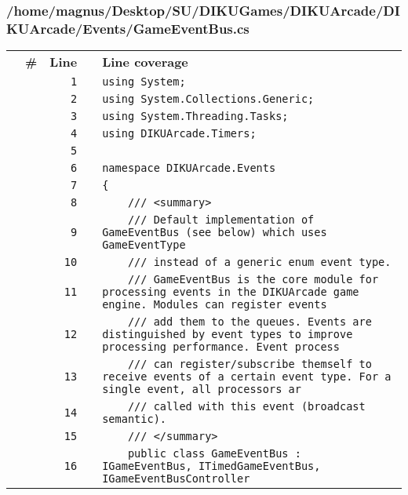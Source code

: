 \documentclass[a4paper,landscape,10pt]{article}
\begin{document}
\subsubsection{/home/magnus/Desktop/SU/DIKUGames/DIKUArcade/DIKUArcade/Events/GameEventBus.cs}
\begin{longtable}[l]{lrrll}
\textbf{} & \textbf{\#} & \textbf{Line} & \textbf{} & \textbf{Line coverage}\\
\cellcolor{gray} &  & \verb~1~ & & \verb~using System;~\\
\cellcolor{gray} &  & \verb~2~ & & \verb~using System.Collections.Generic;~\\
\cellcolor{gray} &  & \verb~3~ & & \verb~using System.Threading.Tasks;~\\
\cellcolor{gray} &  & \verb~4~ & & \verb~using DIKUArcade.Timers;~\\
\cellcolor{gray} &  & \verb~5~ & & \verb~~\\
\cellcolor{gray} &  & \verb~6~ & & \verb~namespace DIKUArcade.Events~\\
\cellcolor{gray} &  & \verb~7~ & & \verb~{~\\
\cellcolor{gray} &  & \verb~8~ & & \verb~    /// <summary>~\\
\cellcolor{gray} &  & \verb~9~ & & \verb~    /// Default implementation of GameEventBus (see below) which uses GameEventType~\\
\cellcolor{gray} &  & \verb~10~ & & \verb~    /// instead of a generic enum event type.~\\
\cellcolor{gray} &  & \verb~11~ & & \verb~    /// GameEventBus is the core module for processing events in the DIKUArcade game engine. Modules can register events~\\
\cellcolor{gray} &  & \verb~12~ & & \verb~    /// add them to the queues. Events are distinguished by event types to improve processing performance. Event process~\\
\cellcolor{gray} &  & \verb~13~ & & \verb~    /// can register/subscribe themself to receive events of a certain event type. For a single event, all processors ar~\\
\cellcolor{gray} &  & \verb~14~ & & \verb~    /// called with this event (broadcast semantic).~\\
\cellcolor{gray} &  & \verb~15~ & & \verb~    /// </summary>~\\
\cellcolor{gray} &  & \verb~16~ & & \verb~    public class GameEventBus : IGameEventBus, ITimedGameEventBus, IGameEventBusController~\\

\end{longtable}
\end{document}
